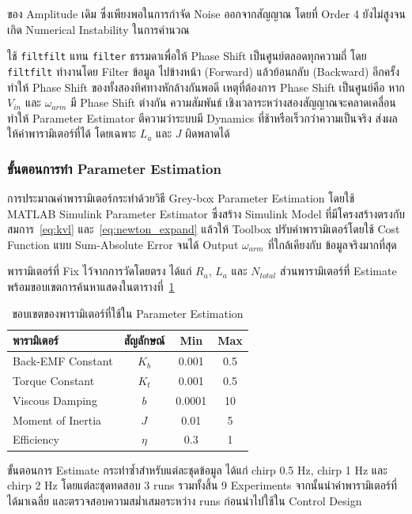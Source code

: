 ของ Amplitude เดิม ซึ่งเพียงพอในการกำจัด Noise ออกจากสัญญาณ
โดยที่ Order 4 ยังไม่สูงจนเกิด Numerical Instability ในการคำนวณ

ใช้ \texttt{filtfilt} แทน \texttt{filter} ธรรมดาเพื่อให้ Phase Shift
เป็นศูนย์ตลอดทุกความถี่ โดย \texttt{filtfilt} ทำงานโดย Filter ข้อมูล
ไปข้างหน้า (Forward) แล้วย้อนกลับ (Backward) อีกครั้ง ทำให้ Phase Shift
ของทั้งสองทิศทางหักล้างกันพอดี เหตุที่ต้องการ Phase Shift เป็นศูนย์คือ
หาก $V_{in}$ และ $\omega_{arm}$ มี Phase Shift ต่างกัน ความสัมพันธ์
เชิงเวลาระหว่างสองสัญญาณจะคลาดเคลื่อน ทำให้ Parameter Estimator
ตีความว่าระบบมี Dynamics ที่ช้าหรือเร็วกว่าความเป็นจริง
ส่งผลให้ค่าพารามิเตอร์ที่ได้ โดยเฉพาะ $L_a$ และ $J$ ผิดพลาดได้

\subsubsection{ขั้นตอนการทำ Parameter Estimation}
\label{subsubsec:parameter_estimation}

การประมาณค่าพารามิเตอร์กระทำด้วยวิธี Grey-box Parameter Estimation
โดยใช้ MATLAB Simulink Parameter Estimator ซึ่งสร้าง Simulink Model
ที่มีโครงสร้างตรงกับสมการ~\eqref{eq:kvl} และ~\eqref{eq:newton_expand}
แล้วให้ Toolbox ปรับค่าพารามิเตอร์โดยใช้ Cost Function แบบ
Sum-Absolute Error จนได้ Output $\omega_{arm}$ ที่ใกล้เคียงกับ
ข้อมูลจริงมากที่สุด

พารามิเตอร์ที่ Fix ไว้จากการวัดโดยตรง ได้แก่ $R_a$, $L_a$ และ $N_{total}$
ส่วนพารามิเตอร์ที่ Estimate พร้อมขอบเขตการค้นหาแสดงในตารางที่~\ref{tab:param_bounds}

\begin{table}[h]
\centering
\caption{ขอบเขตของพารามิเตอร์ที่ใช้ใน Parameter Estimation}
\label{tab:param_bounds}
\begin{tabular}{lccc}
\hline
พารามิเตอร์ & สัญลักษณ์ & Min & Max \\
\hline
Back-EMF Constant   & $K_b$  & 0.001 & 0.5 \\
Torque Constant     & $K_t$  & 0.001 & 0.5 \\
Viscous Damping     & $b$    & 0.0001 & 10 \\
Moment of Inertia   & $J$    & 0.01 & 5 \\
Efficiency          & $\eta$ & 0.3 & 1 \\
\hline
\end{tabular}
\end{table}

ขั้นตอนการ Estimate กระทำซ้ำสำหรับแต่ละชุดข้อมูล ได้แก่
chirp 0.5 Hz, chirp 1 Hz และ chirp 2 Hz โดยแต่ละชุดทดสอบ 3 runs
รวมทั้งสิ้น 9 Experiments จากนั้นนำค่าพารามิเตอร์ที่ได้มาเฉลี่ย
และตรวจสอบความสม่ำเสมอระหว่าง runs ก่อนนำไปใช้ใน
Control Design

